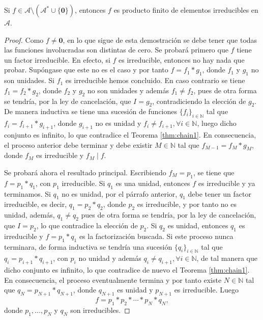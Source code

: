 \begin{proposition}
Si $f \in \mathcal{A}\setminus (\mathcal{A}^* \cup \{ \mathbf{0} \})$, entonces $f$ es producto finito de elementos irreducibles en $\mathcal{A}$.
\end{proposition}
\begin{proof}
Como $f \ne \mathbf{0}$, en lo que sigue de esta demostración se debe tener que todas las funciones involucradas son distintas de cero. Se probará primero que $f$ tiene un factor irreducible. En efecto, si $f$ es irreducible, entonces no hay nada que probar. Supóngase que este no es el caso y por tanto $f=f_1*g_1$, donde $f_1$ y $g_1$ no son unidades. Si $f_1$ es irreducible hemos concluido. En caso contrario se tiene $f_1=f_2*g_2$, donde $f_2$ y $g_2$ no son unidades y además $f_1 \ne f_2$, pues de otra forma se tendría, por la ley de cancelación, que $I=g_2$, contradiciendo la elección de $g_2$. De manera inductiva se tiene una sucesión de funciones $\{ f_i \}_{i \in \mathbb{N}}$ tal que $f_i=f_{i+1}*g_{i+1}$, donde $g_{i+1}$ no es unidad y $f_i \ne f_{i+1}, \forall i \in \mathbb{N}$, luego dicho conjunto es infinito, lo que contradice el Teorema \ref{thm:chain1}. En consecuencia, el proceso anterior debe terminar y debe existir $M \in \mathbb{N}$ tal que $f_{M-1}=f_M*g_M$, donde $f_M$ es irreducible y $f_M \mid f$.
\bigskip

Se probará ahora el resultado principal. Escribiendo $f_M=p_1$, se tiene que $f=p_1*q_1$, con $p_1$ irreducible. Si $q_1$ es una unidad, entonces $f$ es irreducible y ya terminamos. Si $q_1$ no es unidad, por el párrafo anterior, $q_1$ debe tener un factor irreducible, es decir, $q_1=p_2*q_2$, donde $p_2$ es irreducible, y por tanto no es unidad, además, $q_1 \ne q_2$ pues de otra forma se tendría, por la ley de cancelación, que $I=p_2$, lo que contradice la elección de $p_2$. Si $q_2$ es unidad, entonces $q_1$ es irreducible y $f=p_1*q_1$ es la factorización buscada. Si este proceso nunca terminara, de forma inductiva se tendría una sucesión $\{ q_i \}_{i \in \mathbb{N}}$ tal que $q_i=p_{i+1}*q_{i+1}$, con $p_i$ no unidad y además $q_i \ne q_{i+1},\forall i \in \mathbb{N}$, de tal manera que dicho conjunto es infinito, lo que contradice de nuevo el Teorema \ref{thm:chain1}. En consecuencia, el proceso eventualmente termina y por tanto existe $N \in \mathbb{N}$ tal que $q_N=p_{N+1}*q_{N+1}$, donde $q_{N+1}$ es unidad y $p_{N+1}$ es irreducible. Luego
\begin{equation*}
    f=p_1*p_2*\cdots*p_N*q_N,
\end{equation*}
donde $p_1,\ldots,p_{N}$ y $q_N$ son irreducibles.
\end{proof}

